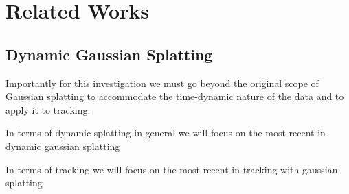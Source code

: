 \section{Related Works}

\subsection{Dynamic Gaussian Splatting}
\label{sec:related_works_gaussian_splatting}
Importantly for this investigation we must go beyond the original scope of Gaussian splatting to accommodate the time-dynamic nature of the data and to apply it to tracking.  

In terms of dynamic splatting in general we will focus on the most recent in dynamic gaussian splatting

In terms of tracking we will focus on the most recent in tracking with gaussian splatting